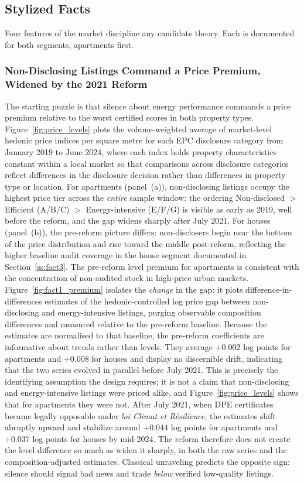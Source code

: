 \subsection{Stylized Facts}
\label{sec:facts}

Four features of the market discipline any candidate theory. Each is documented for both segments,
apartments first.

\subsubsection{Non-Disclosing Listings Command a Price Premium, Widened by the 2021 Reform}
\label{ss:fact1}

The starting puzzle is that silence about energy performance commands a price premium relative to the worst certified scores in both property types. Figure~\ref{fig:price_levels} plots the volume-weighted average of market-level hedonic price indices per square metre for each EPC disclosure category from January 2019 to June 2024, where each index holds property characteristics constant within a local market so that comparisons across disclosure categories reflect differences in the disclosure decision rather than differences in property type or location. For apartments (panel~(a)), non-disclosing listings occupy the highest price tier across the \emph{entire} sample window: the ordering Non-disclosed $>$ Efficient (A/B/C) $>$ Energy-intensive (E/F/G) is visible as early as 2019, well before the reform, and the gap widens sharply after July 2021. For houses (panel~(b)), the pre-reform picture differs: non-disclosers begin near the bottom of the price distribution and rise toward the middle post-reform, reflecting the higher baseline audit coverage in the house segment documented in Section~\ref{ss:fact3}. The pre-reform level premium for apartments is consistent with the concentration of non-audited stock in high-price urban markets. Figure~\ref{fig:fact1_premium} isolates the \emph{change} in the gap: it plots difference-in-differences estimates of the hedonic-controlled log price gap between non-disclosing and energy-intensive listings, purging observable composition differences and measured relative to the pre-reform baseline. Because the estimates are normalised to that baseline, the pre-reform coefficients are informative about trends rather than levels. They average $+0.002$ log points for apartments and $+0.008$ for houses and display no discernible drift, indicating that the two series evolved in parallel before July 2021. This is precisely the identifying assumption the design requires; it is not a claim that non-disclosing and energy-intensive listings were priced alike, and Figure~\ref{fig:price_levels} shows that for apartments they were not. After July 2021, when DPE certificates became legally opposable under \emph{loi Climat et R\'esilience}, the estimates shift abruptly upward and stabilize around $+0.044$ log points for apartments and $+0.037$ log points for houses by mid-2024. The reform therefore does not create the level difference so much as widen it sharply, in both the raw series and the composition-adjusted estimates. Classical unraveling predicts the opposite sign: silence should signal bad news and trade \emph{below} verified low-quality listings.


